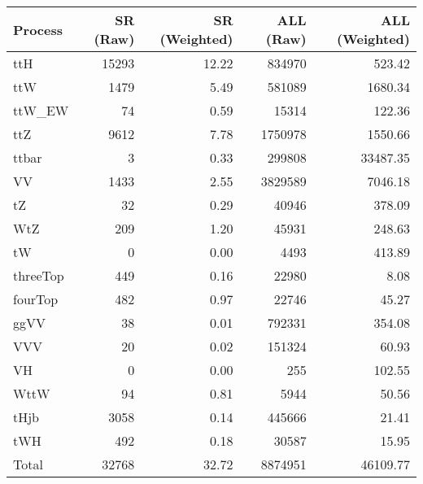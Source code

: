 \begin{tabular}{l|rr|rr}
Process & SR (Raw) & SR (Weighted) & ALL (Raw) & ALL (Weighted) \\
\hline
ttH & 15293 & 12.22 & 834970 & 523.42 \\
ttW & 1479 & 5.49 & 581089 & 1680.34 \\
ttW_EW & 74 & 0.59 & 15314 & 122.36 \\
ttZ & 9612 & 7.78 & 1750978 & 1550.66 \\
ttbar & 3 & 0.33 & 299808 & 33487.35 \\
VV & 1433 & 2.55 & 3829589 & 7046.18 \\
tZ & 32 & 0.29 & 40946 & 378.09 \\
WtZ & 209 & 1.20 & 45931 & 248.63 \\
tW & 0 & 0.00 & 4493 & 413.89 \\
threeTop & 449 & 0.16 & 22980 & 8.08 \\
fourTop & 482 & 0.97 & 22746 & 45.27 \\
ggVV & 38 & 0.01 & 792331 & 354.08 \\
VVV & 20 & 0.02 & 151324 & 60.93 \\
VH & 0 & 0.00 & 255 & 102.55 \\
WttW & 94 & 0.81 & 5944 & 50.56 \\
tHjb & 3058 & 0.14 & 445666 & 21.41 \\
tWH & 492 & 0.18 & 30587 & 15.95 \\
\hline
Total & 32768 & 32.72 & 8874951 & 46109.77 \\
\end{tabular}
